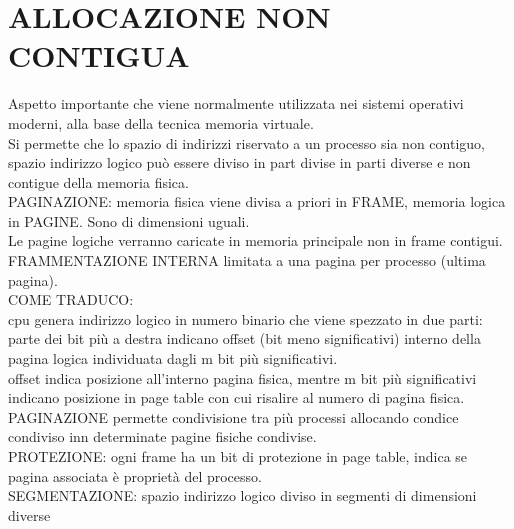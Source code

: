 \documentclass{article}
\begin{document}
\section{ALLOCAZIONE NON CONTIGUA}
Aspetto importante che viene normalmente utilizzata nei sistemi operativi moderni, alla base della tecnica memoria virtuale. \\
Si permette che lo spazio di indirizzi riservato a un processo sia non contiguo, spazio indirizzo logico può essere diviso in part 
divise in parti diverse e non contigue della memoria fisica.\\
PAGINAZIONE: memoria fisica viene divisa a priori in FRAME, memoria logica in PAGINE. Sono di dimensioni uguali.\\
Le pagine logiche verranno caricate in memoria principale non in frame contigui.\\
FRAMMENTAZIONE INTERNA limitata a una pagina per processo (ultima pagina).\\
COME TRADUCO:\\
cpu genera indirizzo logico in numero binario che viene spezzato in due parti:\\
parte dei bit più a destra indicano offset (bit meno significativi) interno della pagina logica individuata dagli m bit più significativi.\\
offset indica posizione all'interno pagina fisica, mentre m bit più significativi indicano posizione in page table con cui risalire al numero di pagina fisica.\\
PAGINAZIONE permette condivisione tra più processi allocando condice condiviso inn determinate pagine fisiche condivise.\\
PROTEZIONE: ogni frame ha un bit di protezione in page table, indica se pagina associata è proprietà del processo.\\
SEGMENTAZIONE: spazio indirizzo logico diviso in segmenti di dimensioni diverse\\
\end{document}
